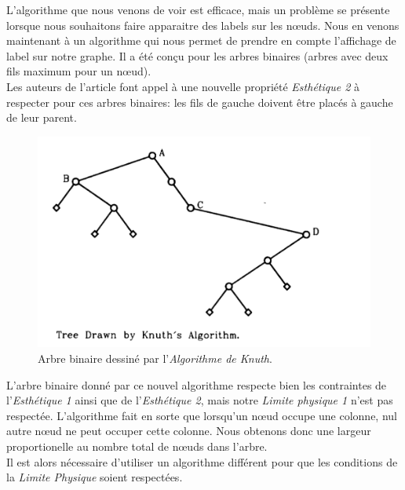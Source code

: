 \documentclass{article}
\begin{document}
    L'algorithme que nous venons de voir est efficace, mais un problème se présente lorsque nous souhaitons faire apparaitre des labels sur les n\oe{}uds. Nous en venons maintenant à un algorithme qui nous permet de prendre en compte l'affichage de label sur notre graphe. Il a été conçu pour les arbres binaires (arbres avec deux fils maximum pour un n\oe{}ud).\\

    Les auteurs de l'article \cite{article79} font appel à une nouvelle propriété \emph{Esthétique 2} à respecter pour ces arbres binaires: les fils de gauche doivent être placés à gauche de leur parent.\\

    \vfill
    \begin{figure}[h]
    		\begin{center}
    			\includegraphics[scale=0.5]{arbreBinaire.png}
    		\end{center}
    	\caption{Arbre binaire dessiné par l'\emph{Algorithme de Knuth}. \cite{article79}}
      \label{fig:arbreBinaire}
    \end{figure}
    \vfill

    L'arbre binaire donné par ce nouvel algorithme respecte bien les contraintes de l'\emph{Esthétique 1} ainsi que de l'\emph{Esthétique 2}, mais notre \emph{Limite physique 1} n'est pas respectée. L'algorithme fait en sorte que lorsqu’un n\oe{}ud occupe une colonne, nul autre n\oe{}ud ne peut occuper cette colonne. Nous obtenons donc une largeur proportionelle au nombre total de n\oe{}uds dans l'arbre.\\

    Il est alors nécessaire d'utiliser un algorithme différent pour que les conditions de la \emph{Limite Physique} soient respectées.\\
\end{document}
